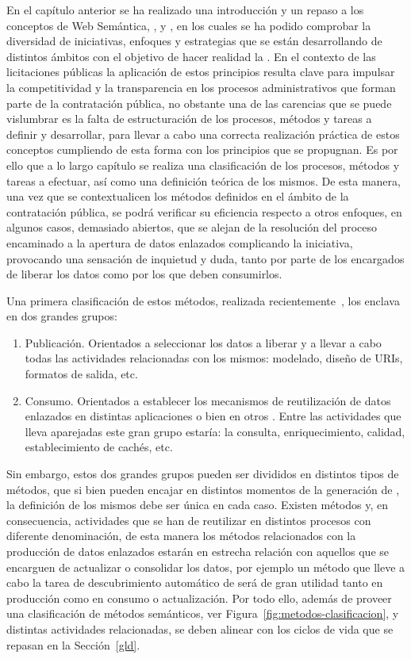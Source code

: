 En el capítulo anterior se ha realizado una introducción y un repaso a los conceptos
de  Web Semántica, \opendata, \linkeddata y \lod, en los cuales se ha podido comprobar
la diversidad de iniciativas, enfoques y estrategias que se están desarrollando de distintos ámbitos 
con el objetivo de hacer realidad la \wod. En el contexto
de las licitaciones públicas la aplicación de estos principios resulta clave para impulsar
la competitividad y la transparencia en los procesos administrativos que forman parte
de la contratación pública, no obstante una de las carencias que se puede vislumbrar
es la falta de estructuración de los procesos, métodos y tareas a definir
y desarrollar, para llevar a cabo una correcta realización práctica de estos conceptos
cumpliendo de esta forma con los principios que se propugnan. Es por ello que a lo largo 
capítulo se realiza una clasificación de los procesos, métodos y tareas
a efectuar, así como una definición teórica de los mismos. De esta manera,
una vez que se contextualicen los métodos definidos en el ámbito de la contratación pública, se podrá verificar su eficiencia respecto
a otros enfoques, en algunos casos, demasiado abiertos, que se alejan de la resolución del proceso 
encaminado a la apertura de datos enlazados complicando la iniciativa, provocando una sensación
de inquietud y duda, tanto por parte de los encargados de liberar los datos como 
por los que deben consumirlos.

Una primera clasificación de estos métodos, realizada recientemente~\cite{cold}, los enclava en dos grandes grupos:
\begin{enumerate}
 \item Publicación. Orientados a seleccionar los datos a liberar y a llevar a cabo
todas las actividades relacionadas con los mismos: modelado, diseño de URIs, formatos
de salida, etc.
 \item Consumo. Orientados a establecer los mecanismos de reutilización de datos enlazados
en distintas aplicaciones o bien en otros \datasets. Entre las actividades que lleva aparejadas
este gran grupo estaría: la consulta, enriquecimiento, calidad, establecimiento de cachés, etc.
\end{enumerate}

Sin embargo, estos dos grandes grupos pueden ser divididos en distintos tipos de métodos, que si bien
pueden encajar en distintos momentos de la generación de \linkeddata, la definición de los mismos debe ser única en cada caso. Existen
métodos y, en consecuencia, actividades que se han de reutilizar en distintos procesos con diferente denominación, de esta manera 
los métodos relacionados con la producción de datos enlazados estarán en estrecha relación
con aquellos que se encarguen de actualizar o consolidar los datos, por ejemplo un método que lleve
a cabo la tarea de descubrimiento automático de \datasets será de gran utilidad tanto en producción como en consumo o actualización. 
Por todo ello, además de proveer una clasificación de métodos semánticos, ver Figura~\ref{fig:metodos-clasificacion}, y distintas actividades 
relacionadas, se deben alinear con los ciclos de vida que se repasan en la Sección~\ref{gld}.


